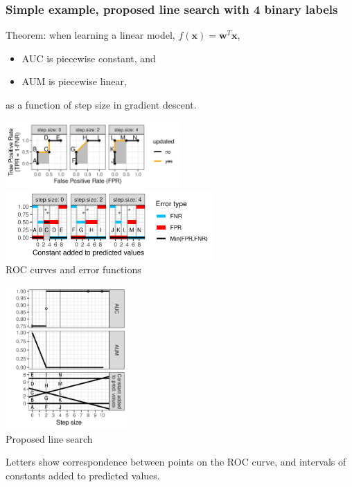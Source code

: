\documentclass[t]{beamer}
\begin{document}
\begin{frame}
\frametitle{Simple example, proposed line search with 4 binary labels}

  Theorem: when learning a linear model, $f(\mathbf x)= \mathbf w^T \mathbf x$,
  \begin{itemize}
  \item AUC is piecewise constant, and
  \item AUM is piecewise linear,
  \end{itemize}
  as a function of step size in gradient descent.

  \begin{center}
\parbox{0.6\textwidth}{
\hspace{0.0cm}
\includegraphics[width=0.5\textwidth]{figure-line-search-example-binary-roc.png}
\\
\includegraphics[width=0.6\textwidth]{figure-line-search-example-binary-error.png}\\
ROC curves and error functions
}\parbox{0.39\textwidth}{
  \includegraphics[width=0.35\textwidth]{figure-line-search-example-binary.png}\\
  Proposed line search
}
  \end{center}
  
  Letters show correspondence between points on the ROC curve, and intervals of constants added to predicted values.

\end{frame}
\end{document}
